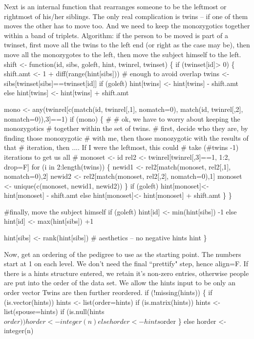 \documentclass{article}
\begin{document}
\begin{enumerate}
Next is an internal function that  rearranges someone to be
the leftmost or rightmost of his/her siblings.  The only
real complication is twins -- if one of them moves the other has to move too.  
And we need to keep the monozygotics together within a band of triplets.
Algorithm: if the person to be moved is part of a twinset, 
first move all the twins to the left end (or right
as the case may be), then move all the monozygotes to the
left, then move the subject himself to the left.
\nwenddocs{}\endmoddef
shift <- function(id, sibs, goleft, hint, twinrel, twinset) \{
    if (twinset[id]> 0)  \{ 
        shift.amt <- 1 + diff(range(hint[sibs]))  # enough to avoid overlap
        twins <- sibs[twinset[sibs]==twinset[id]]
        if (goleft) 
         hint[twins] <- hint[twins] - shift.amt
        else hint[twins] <- hint[twins] + shift.amt
            
        mono  <- any(twinrel[c(match(id, twinrel[,1], nomatch=0),
                           match(id, twinrel[,2], nomatch=0)),3]==1)
        if (mono) \{
        #
        # ok, we have to worry about keeping the monozygotics
        #  together within the set of twins.
        # first, decide who they are, by finding those monozygotic
            #  with me, then those monozygotic with the results of that
            #  iteration, then ....  If I were the leftmost, this could
            #  take (#twins -1) iterations to get us all
            #
        monoset <- id
        rel2 <- twinrel[twinrel[,3]==1, 1:2, drop=F]
        for (i in 2:length(twins)) \{
            newid1 <- rel2[match(monoset, rel2[,1], nomatch=0),2]
            newid2 <- rel2[match(monoset, rel2[,2], nomatch=0),1]
            monoset <- unique(c(monoset, newid1, newid2))
            \}
        if (goleft) 
               hint[monoset]<- hint[monoset] - shift.amt
        else   hint[monoset]<- hint[monoset] + shift.amt
        \}
        \}

    #finally, move the subject himself
    if (goleft) hint[id] <- min(hint[sibs]) -1   
    else        hint[id] <- max(hint[sibs]) +1

    hint[sibs] <- rank(hint[sibs])  # aesthetics -- no negative hints
    hint
    \}
\nwendcode{}\nwdocspar

Now, get an ordering of the pedigree to use as the starting point.  
The numbers start at 1 on each level.
We don't need the final ``prettify" step, hence align=F.
If there is a hints structure entered, we retain it's non-zero entries,
otherwise people are put into the order of the data set. 
We allow the hints input to be only an order vector
Twins are
then further reordered.
\nwenddocs{}\endmoddef
if (!missing(hints)) \{
    if (is.vector(hints)) hints <- list(order=hints)
    if (is.matrix(hints)) hints <- list(spouse=hints)
    if (is.null(hints$order)) horder <- integer(n)
    else horder <- hints$order
    \}
else horder <- integer(n)


\end{enumerate}
\end{document}
